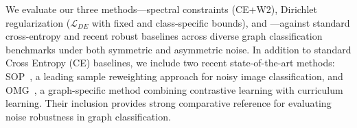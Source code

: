 









We evaluate our three methods---spectral constraints (CE+W2), Dirichlet regularization ($\mathcal{L}_{DE}$ with fixed and class-specific bounds), and \method---against standard cross-entropy and recent robust baselines across diverse graph classification benchmarks under both symmetric and asymmetric noise. In addition to standard Cross Entropy (CE) baselines, we include two recent state-of-the-art methods: SOP~\cite{liu2022robusttraininglabelnoise}, a leading sample reweighting approach for noisy image classification, and OMG~\cite{omg7}, a graph-specific method combining contrastive learning with curriculum learning. Their inclusion provides strong comparative reference for evaluating noise robustness in graph classification.

